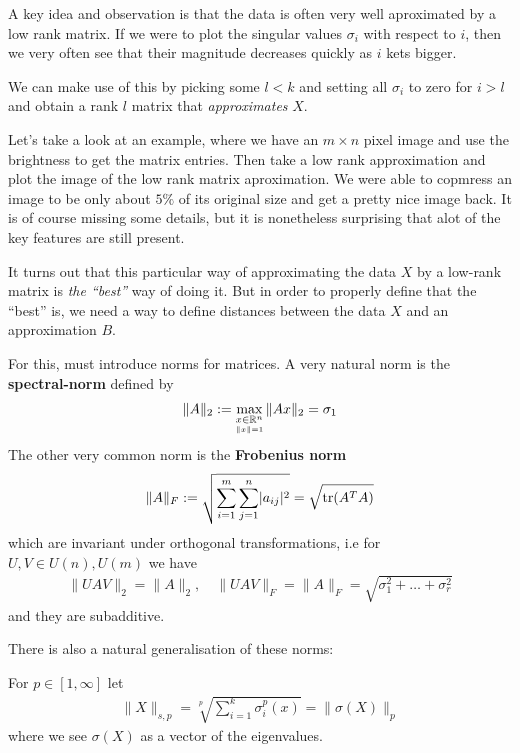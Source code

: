 A key idea and observation is that the data is often very well aproximated by a low rank matrix.
If we were to plot the singular values $\sigma_i$ with respect to $i$, then we very often see that their magnitude decreases quickly as $i$ kets bigger.

We can make use of this by picking some $l < k$ and setting all $\sigma_i$ to zero for $i > l$ and obtain a rank $l$ matrix that \emph{approximates} $X$.



\begin{ex}
Let's take a look at an example, where we have an $m \times n$ pixel image and use the brightness to get the matrix entries.
Then take a low rank approximation and plot the image of the low rank matrix aproximation.
We were able to copmress an image to be only about $5\%$ of its original size and get a pretty nice image back. It is of course missing some details, but it is nonetheless surprising that alot of the key features are still present.
\end{ex}

It turns out that this particular way of approximating the data $X$ by a low-rank matrix is \emph{the ``best''} way of doing it.
But in order to properly define that the ``best'' is, we need a way to define distances between the data $X$ and an approximation $B$.

For this, must introduce norms for  matrices. 
A very natural norm is the \textbf{spectral-norm} defined by
\begin{align*}
  \|A\|_2 := \max_{\underset{\|x\| = 1}{x \in \mathbb{R}^{n}}} \|Ax\|_2 = \sigma_1
\end{align*}
The other very common norm is the \textbf{Frobenius norm}
\begin{align*}
  \|A\|_F := \sqrt{
    \sum_{i = 1}^{m}\sum_{j=1}^{n} \abs{a_{ij}}^{2}
  }
  =
  \sqrt{\text{tr}(A^{T}A)}
\end{align*}
which are invariant under orthogonal transformations, i.e for $U,V \in U(n), U(m)$ we have
\begin{align*}
  \|UAV\|_2 = \|A\|_2, \quad \|UAV\|_F = \|A\|_F= \sqrt{\sigma_1^{2} + \ldots + \sigma_r^{2}}
\end{align*}
and they are subadditive.

There is also a natural generalisation of these norms:
\begin{dfn}
  For $p \in [1,\infty]$ let
\begin{align*}
  \|X\|_{s,p} = \sqrt[p]{
    \sum_{i=1}^{k} \sigma_i^{p}(x)
  }
  = \|\sigma(X)\|_p
\end{align*}
where we see $\sigma(X)$ as a vector of the eigenvalues.
\end{dfn}

